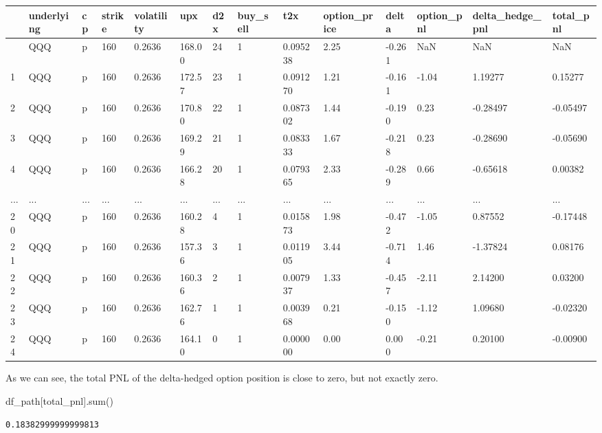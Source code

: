 \documentclass[
  letterpaper,
  DIV=11,
  numbers=noendperiod]{scrreprt}
\newenvironment{Shaded}{\begin{snugshade}}{\end{snugshade}}
\newcommand{\BuiltInTok}[1]{\textcolor[rgb]{0.00,0.23,0.31}{#1}}
\newcommand{\NormalTok}[1]{\textcolor[rgb]{0.00,0.23,0.31}{#1}}
\newcommand{\StringTok}[1]{\textcolor[rgb]{0.13,0.47,0.30}{#1}}
\begin{document}
\begin{longtable}[]{@{}llllllllllllll@{}}
\toprule\noalign{}
& underlying & cp & strike & volatility & upx & d2x & buy\_sell & t2x &
option\_price & delta & option\_pnl & delta\_hedge\_pnl & total\_pnl \\
\midrule\noalign{}
\endhead
\bottomrule\noalign{}
\endlastfoot
0 & QQQ & p & 160 & 0.2636 & 168.00 & 24 & 1 & 0.095238 & 2.25 & -0.261
& NaN & NaN & NaN \\
1 & QQQ & p & 160 & 0.2636 & 172.57 & 23 & 1 & 0.091270 & 1.21 & -0.161
& -1.04 & 1.19277 & 0.15277 \\
2 & QQQ & p & 160 & 0.2636 & 170.80 & 22 & 1 & 0.087302 & 1.44 & -0.190
& 0.23 & -0.28497 & -0.05497 \\
3 & QQQ & p & 160 & 0.2636 & 169.29 & 21 & 1 & 0.083333 & 1.67 & -0.218
& 0.23 & -0.28690 & -0.05690 \\
4 & QQQ & p & 160 & 0.2636 & 166.28 & 20 & 1 & 0.079365 & 2.33 & -0.289
& 0.66 & -0.65618 & 0.00382 \\
... & ... & ... & ... & ... & ... & ... & ... & ... & ... & ... & ... &
... & ... \\
20 & QQQ & p & 160 & 0.2636 & 160.28 & 4 & 1 & 0.015873 & 1.98 & -0.472
& -1.05 & 0.87552 & -0.17448 \\
21 & QQQ & p & 160 & 0.2636 & 157.36 & 3 & 1 & 0.011905 & 3.44 & -0.714
& 1.46 & -1.37824 & 0.08176 \\
22 & QQQ & p & 160 & 0.2636 & 160.36 & 2 & 1 & 0.007937 & 1.33 & -0.457
& -2.11 & 2.14200 & 0.03200 \\
23 & QQQ & p & 160 & 0.2636 & 162.76 & 1 & 1 & 0.003968 & 0.21 & -0.150
& -1.12 & 1.09680 & -0.02320 \\
24 & QQQ & p & 160 & 0.2636 & 164.10 & 0 & 1 & 0.000000 & 0.00 & 0.000 &
-0.21 & 0.20100 & -0.00900 \\
\end{longtable}

As we can see, the total PNL of the delta-hedged option position is
close to zero, but not exactly zero.

\begin{Shaded}
\begin{Highlighting}[]
\NormalTok{df\_path[}\StringTok{\textquotesingle{}total\_pnl\textquotesingle{}}\NormalTok{].}\BuiltInTok{sum}\NormalTok{()}
\end{Highlighting}
\end{Shaded}

\begin{verbatim}
0.18382999999999813
\end{verbatim}
\end{document}
